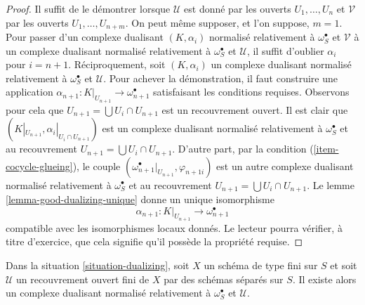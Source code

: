 \begin{proof}
Il suffit de le démontrer lorsque $\mathcal{U}$ est donné par les ouverts $U_1, \ldots, U_n$ et $\mathcal{V}$ par les ouverts $U_1, \ldots, U_{n + m}$. On peut même supposer, et l'on suppose, $m = 1$. Pour passer d'un complexe dualisant $(K, \alpha_i)$ normalisé relativement à $\omega_S^\bullet$ et $\mathcal{V}$ à un complexe dualisant normalisé relativement à $\omega_S^\bullet$ et $\mathcal{U}$, il suffit d'oublier $\alpha_i$ pour $i = n + 1$. Réciproquement, soit $(K, \alpha_i)$ un complexe dualisant normalisé relativement à $\omega_S^\bullet$ et $\mathcal{U}$. Pour achever la démonstration, il faut construire une application $\alpha_{n + 1} : K|_{U_{n + 1}} \to \omega_{n + 1}^\bullet$ satisfaisant les conditions requises. Observons pour cela que $U_{n + 1} = \bigcup U_i \cap U_{n + 1}$ est un recouvrement ouvert. Il est clair que $(K|_{U_{n + 1}}, \alpha_i|_{U_i \cap U_{n + 1}})$ est un complexe dualisant normalisé relativement à $\omega_S^\bullet$ et au recouvrement $U_{n + 1} = \bigcup U_i \cap U_{n + 1}$. D'autre part, par la condition (\ref{item-cocycle-glueing}), le couple
$(\omega_{n + 1}^\bullet|_{U_{n + 1}}, \varphi_{n + 1i})$
est un autre complexe dualisant normalisé relativement à $\omega_S^\bullet$ et au recouvrement $U_{n + 1} = \bigcup U_i \cap U_{n + 1}$. Le lemme \ref{lemma-good-dualizing-unique} donne un unique isomorphisme
$$
\alpha_{n + 1} : K|_{U_{n + 1}} \longrightarrow \omega_{n + 1}^\bullet
$$
compatible avec les isomorphismes locaux donnés. Le lecteur pourra vérifier, à titre d'exercice, que cela signifie qu'il possède la propriété requise.
\end{proof}

\begin{lemma}
\label{lemma-existence-good-dualizing}
Dans la situation \ref{situation-dualizing}, soit $X$ un schéma de type fini sur $S$ et soit $\mathcal{U}$ un recouvrement ouvert fini de $X$ par des schémas séparés sur $S$. Il existe alors un complexe dualisant normalisé relativement à $\omega_S^\bullet$ et $\mathcal{U}$.
\end{lemma}

